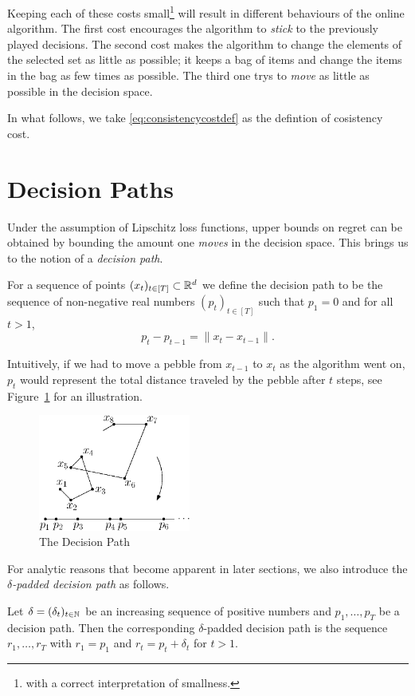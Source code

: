 Keeping each of these costs small\footnote{with a correct interpretation of smallness.} will result in different behaviours of the online algorithm. The first cost encourages the algorithm to \emph{stick} to the previously played decisions. The second cost makes the algorithm to change the elements of the selected set as little as possible; it keeps a bag of items and change the items in the bag as few times as possible. The third one trys to \emph{move} as little as possible in the decision space.

In what follows, we take \eqref{eq:consistencycostdef} as the defintion of cosistency cost.

\section{Decision Paths}\label{sec:decpath}
Under the assumption of Lipschitz loss functions, upper bounds on regret can be obtained by bounding the amount one \emph{moves} in the decision space. This brings us to the notion of a \emph{decision path}.

\begin{definition}
    For a sequence of points $(x_t)_{t\in[T]} \subset \mathbb{R}^d$ we define the decision path to be the sequence of non-negative real numbers $(p_t)_{t\in [T]}$ such that $p_1= 0$ and for all $t > 1$,
\[
  p_t - p_{t-1} = \|x_t - x_{t-1}\|.
\]
\end{definition}
Intuitively, if we had to move a pebble from $x_{t-1}$ to $x_t$ as the algorithm went on, $p_t$ would represent the total distance traveled by the pebble after $t$ steps, see Figure~\ref{fig:decisionpath} for an illustration.
\begin{figure}[h!]
    \centering
    \includegraphics[width=5cm]{figures/decision-path}
    \caption{The Decision Path}
    \label{fig:decisionpath}
\end{figure}

For analytic reasons that become apparent in later sections, we also introduce the \emph{$\delta$-padded decision path} as follows. 
\begin{definition}
Let $\delta = (\delta_t)_{t\in\mathbb{N}}$ be an increasing sequence of positive numbers and  $p_1, \ldots, p_T$ be a decision path. Then the corresponding $\delta$-padded decision path is the sequence $r_1, \ldots, r_T$ with $r_1 = p_1$ and $r_t = p_t + \delta_t$ for $t>1$.
\end{definition} 

